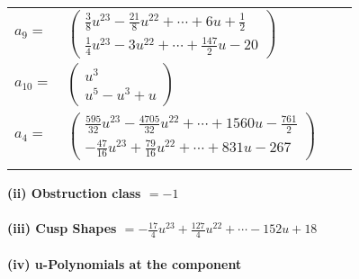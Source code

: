 \documentclass[1p]{elsarticle_modified}
\theoremstyle{definition}
\begin{document}
\begin{tabular}{m{7pt} m{180pt} m{7pt} m{180pt} }
\flushright $a_{9}=$&$\begin{pmatrix}\frac{3}{8} u^{23}-\frac{21}{8} u^{22}+\cdots+6 u+\frac{1}{2}\\\frac{1}{4} u^{23}-3 u^{22}+\cdots+\frac{147}{2} u-20\end{pmatrix}$ \\
\flushright $a_{10}=$&$\begin{pmatrix}u^3\\u^5- u^3+u\end{pmatrix}$ \\
\flushright $a_{4}=$&$\begin{pmatrix}\frac{595}{32} u^{23}-\frac{4705}{32} u^{22}+\cdots+1560 u-\frac{761}{2}\\-\frac{47}{16} u^{23}+\frac{79}{16} u^{22}+\cdots+831 u-267\end{pmatrix}$\\&\end{tabular}
\flushleft \textbf{(ii) Obstruction class $= -1$}\\~\\
\flushleft \textbf{(iii) Cusp Shapes $= -\frac{17}{4} u^{23}+\frac{127}{4} u^{22}+\cdots-152 u+18$}\\~\\
\newpage\renewcommand{\arraystretch}{1}
\flushleft \textbf{(iv) u-Polynomials at the component}\newline \\
\end{document}
